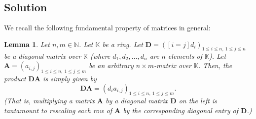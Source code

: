 \documentclass[paper=a4, fontsize=12pt]{scrartcl}%
\theoremstyle{plainsl}
\newtheorem{lemma}[theorem]{Lemma}
\theoremstyle{definition}
\theoremstyle{remark}
\begin{document}
\subsection{Solution}

We recall the following fundamental property of matrices in general:

\begin{lemma}
\label{lem.sol.matrix.gcd-LDU.row-mult}Let $n,m\in\mathbb{N}$. Let
$\mathbb{K}$ be a ring. Let $\mathbf{D}=\left(  \left[  i=j\right]
d_{i}\right)  _{1\leq i\leq n,\ 1\leq j\leq n}$ be a diagonal matrix over
$\mathbb{K}$ (where $d_{1},d_{2},\ldots,d_{n}$ are $n$ elements of
$\mathbb{K}$). Let $\mathbf{A}=\left(  a_{i,j}\right)  _{1\leq i\leq n,\ 1\leq
j\leq m}$ be an arbitrary $n\times m$-matrix over $\mathbb{K}$. Then, the
product $\mathbf{D}\mathbf{A}$ is simply given by
\begin{equation}
\mathbf{D}\mathbf{A}=\left(  d_{i}a_{i,j}\right)  _{1\leq i\leq n,\ 1\leq
j\leq m}. \label{eq.matrix.gcd-LDU.row-mult}%
\end{equation}
(That is, multiplying a matrix $\mathbf{A}$ by a diagonal matrix $\mathbf{D}$
on the left is tantamount to rescaling each row of $\mathbf{A}$ by the
corresponding diagonal entry of $\mathbf{D}$.)
\end{lemma}
\end{document}
